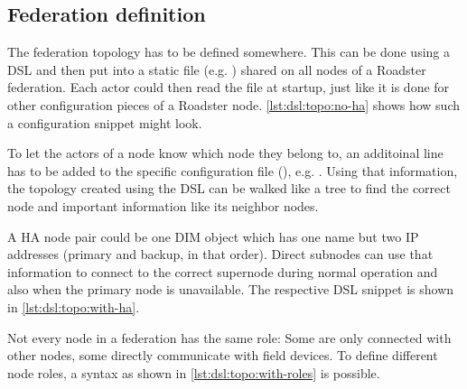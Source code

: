 \subsection{Federation definition}
The federation topology has to be defined somewhere. This can be done using a
\gls{DSL} and then put into a static file (e.g. ) shared
on all nodes of a Roadster federation. Each actor could then read the file at
startup, just like it is done for other configuration pieces of a Roadster node.
\autoref{lst:dsl:topo:no-ha} shows how such a configuration snippet might look.

To let the actors of a node know which node they belong to, an additoinal line
has to be added to the specific configuration file (), e.g.
. Using that information, the topology
created using the DSL can be walked like a tree to find the correct node and
important information like its neighbor nodes.

A HA node pair could be one DIM object which has one name but two IP addresses
(primary and backup, in that order). Direct subnodes can use that information
to connect to the correct supernode during normal operation and also
when the primary node is unavailable. The respective DSL snippet is shown in
\autoref{lst:dsl:topo:with-ha}.

Not every node in a federation has the same role: Some are only connected with other
nodes, some directly communicate with field devices. To define different node roles, a
syntax as shown in \autoref{lst:dsl:topo:with-roles} is possible.


